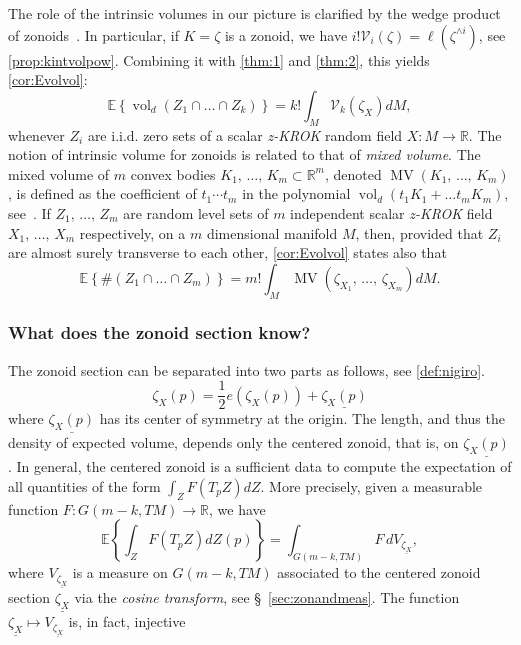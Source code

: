 \documentclass[AHL, Unicode, longabstracts, published]{cedram}
\newcommand{\R}{\mathbb{R}}
\newcommand{\EE}{\mathbb{E}}
\DeclareMathOperator{\vol}{vol}
\DeclareMathOperator{\MV}{MV}
\newcommand{\Vint}{\mathcal{V}}
\newcommand{\seg}{\underline}
\newcommand{\zkrok}{\emph{z-KROK}\xspace}
\begin{document}
The role of the intrinsic volumes in our picture is clarified by the wedge product of zonoids~\cite{ZA}. In particular, if $K=\zeta$ is a zonoid, we have $ i!\Vint_i(\zeta)=\ell(\zeta^{\wedge i}) $, see \cref{prop:kintvolpow}. Combining it with \cref{thm:1} and \cref{thm:2}, this yields \cref{cor:Evolvol}:
\begin{equation*}
\EE\left\{\vol_d(Z_1\cap \dots \cap Z_k)\right\}=k!\int_M\Vint_k(\zeta_{X})dM,
\end{equation*}
whenever $Z_i$ are i.i.d. zero sets of a scalar {\zkrok} random field $X\colon M\to \R$. The notion of intrinsic volume for zonoids is related to that of \emph{mixed volume}. The mixed volume of $m$ convex bodies $K_1,\,\ldots,\,K_m\subset \R^m$, denoted $\MV(K_1,\,\dots,\,K_m)$, is defined as the coefficient of $t_1\cdots t_m$ in the polynomial $\vol_d(t_1K_1+\dots t_mK_m)$, see~\cite[Theorem~5.1.7]{bible}. If $Z_1,\,\ldots,\,Z_m$ are random level sets of $m$ independent scalar {\zkrok} field $X_1,\,\ldots,\,X_m$ respectively, on a $m$ dimensional manifold $M$, then, provided that $Z_i$ are almost surely transverse to each other, \cref{cor:Evolvol} states also that
\begin{equation*}
\EE\left\{\#(Z_1\cap \dots \cap Z_m)\right\}=m!\int_M\MV(\zeta_{X_1},\,\dots,\,\zeta_{X_m})dM.
\end{equation*}

\subsubsection{What does the zonoid section know?}

The zonoid section can be separated into two parts as follows, see \cref{def:nigiro}.
\begin{equation}\label{eq:separation}
\zeta_X(p)=\frac12 e(\zeta_X(p))+\underline{\zeta_X(p)}
\end{equation}
where $\underline{\zeta_X(p)}$ has its center of symmetry at the origin. The length, and thus the density of expected volume, depends only the centered zonoid, that is, on $\underline{\zeta_X(p)}$. In general, the centered zonoid is a sufficient data to compute the expectation of all quantities of the form $\int_ZF(T_pZ)dZ$. More precisely, given a measurable function $F:G(m-k,TM)\to \R$, we have
\begin{equation}\label{eq:sexy}
\EE\left\{\int_Z F\left( T_pZ\right) dZ(p)\right\}=\int_{G(m-k,TM)}F\, d V_{\seg{\zeta_X}},
\end{equation}
where $V_{\seg{\zeta_X}}$ is a measure on $G(m-k,TM)$ associated to the centered zonoid section $\seg{\zeta_X}$ via the \emph{cosine transform}, see \S~\ref{sec:zonandmeas}. The function $\seg{\zeta_X}\mapsto V_{\seg{\zeta_X}}$ is, in fact, injective
\end{document}
